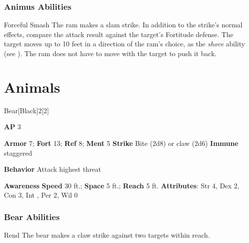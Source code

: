 \subsubsection{Animus Abilities}

\begin{freeability}{Forceful Smash}
The ram makes a slam strike.
In addition to the strike's normal effects, compare the attack result against the target's Fortitude defense.
\hit The target moves up to 10 feet in a direction of the ram's choice, as the \textit{shove} ability (see ).
The ram does not have to move with the target to push it back.
\end{freeability}

\section{Animals}
\begin{monsection}{Bear}[Black]{2}[2]
\vspace{-1em}\vspace{-1em}
\begin{spellcontent}
\begin{spelltargetinginfo}
{\textbf{AP} 3}

\pari \textbf{Armor} 7;
\textbf{Fort} 13;
\textbf{Ref} 8;
\textbf{Ment} 5
\pari \textbf{Strike} Bite  (2d8) or claw  (2d6)
\pari \textbf{Immune} staggered


\pari \textbf{Behavior} Attack highest threat
\end{spelltargetinginfo}
\end{spellcontent}

\begin{monsterfooter}
\pari \textbf{Awareness} 
\pari \textbf{Speed} 30 ft.;
\textbf{Space} 5 ft.;
\textbf{Reach} 5 ft.
\pari \textbf{Attributes}:
Str 4,
Dex 2,
Con 3,
Int ,
Per 2,
Wil 0
\end{monsterfooter}
\end{monsection}


\subsubsection{Bear Abilities}

\begin{freeability}{Rend}
The bear makes a claw strike against two targets within reach.
\end{freeability}

